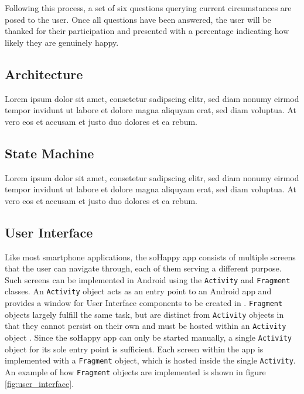 Following this process, a set of six questions querying current circumstances are posed to the user. Once all questions have been answered, the user will be thanked for their participation and presented with a percentage indicating how likely they are genuinely happy.

\subsection{Architecture}
Lorem ipsum dolor sit amet, consetetur sadipscing elitr, sed diam nonumy eirmod tempor invidunt ut labore et dolore magna aliquyam erat, sed diam voluptua. At vero eos et accusam et justo duo dolores et ea rebum.

\subsection{State Machine}
Lorem ipsum dolor sit amet, consetetur sadipscing elitr, sed diam nonumy eirmod tempor invidunt ut labore et dolore magna aliquyam erat, sed diam voluptua. At vero eos et accusam et justo duo dolores et ea rebum.

\subsection{User Interface} \label{sec:user_interface}
Like most smartphone applications, the soHappy app consists of multiple screens that the user can navigate through, each of them serving a different purpose. Such screens can be implemented in Android using the \texttt{Activity} and \texttt{Fragment} classes. An \texttt{Activity} object acts as an entry point to an Android app and provides a window for User Interface components to be created in \cite{intro_to_activities}. \texttt{Fragment} objects largely fulfill the same task, but are distinct from \texttt{Activity} objects in that they cannot persist on their own and must be hosted within an \texttt{Activity} object \cite{intro_to_fragments}. Since the soHappy app can only be started manually, a single \texttt{Activity} object for its sole entry point is sufficient. Each screen within the app is implemented with a \texttt{Fragment} object, which is hosted inside the single \texttt{Activity}. An example of how \texttt{Fragment} objects are implemented is shown in figure \ref{fig:user_interface}.

